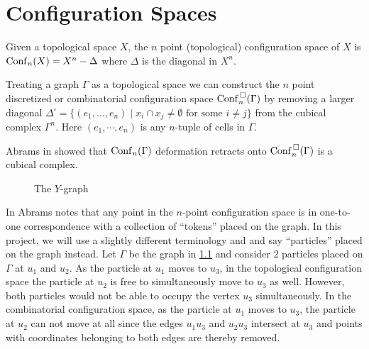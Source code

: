 \chapter{Configuration Spaces}
Given a topological space \(X\), the \(n\) point (topological) configuration space of \(X\) is
\(\mathrm{Conf}_n(X) = X^n - \Delta\) where \(\Delta\) is the diagonal in \(X^n\).

Treating a graph \(\Gamma\) as a topological space we can construct the
\(n\) point discretized or combinatorial configuration space \(\mathrm{Conf}^{\,\square}_n(\Gamma)\) by 
removing a larger diagonal \(\Delta^{\square} = \{(e_1, \ldots, e_n) \mid x_i \cap x_j \neq \emptyset \text{ for some } i \neq j\}\)
from the cubical complex \(\Gamma^n\). Here \((e_1, \cdots, e_n)\) is any \(n\)-tuple of cells in \(\Gamma\).

Abrams in \cite{abrams2000configurationspaces} showed that \(\mathrm{Conf}_n(\Gamma)\) deformation retracts onto \(\mathrm{Conf}^{\,\square}_n(\Gamma)\) is a cubical complex.
\begin{figure}
\centering
{}
\caption{The \(Y\)-graph}
\label{fig:ygraph}
\end{figure}
In \cite{abrams2000configurationspaces} Abrams notes that any point in the
\(n\)-point configuration space is in one-to-one correspondence with a
collection of ``tokens'' placed on the graph. In this project, we will use a slightly different terminology and
and say ``particles'' placed on the graph instead.  Let \(\Gamma\) be the graph
in \ref{fig:ygraph} and consider \(2\) particles placed on \(\Gamma\) at \(u_1\)
and \(u_2\).  As the particle at \(u_1\) moves to \(u_3\), in the topological
configuration space the particle at \(u_2\) is free to simultaneously move to
\(u_3\) as well. However, both particles would not be able to occupy the vertex
\(u_3\) simultaneously.  In the combinatorial configuration space, as the
particle at \(u_1\) moves to \(u_3\), the particle at \(u_2\) can not move at
all since the edges \(u_1 u_3\) and \(u_2 u_3\) intersect at \(u_3\) and points
with coordinates belonging to both edges are thereby removed.

